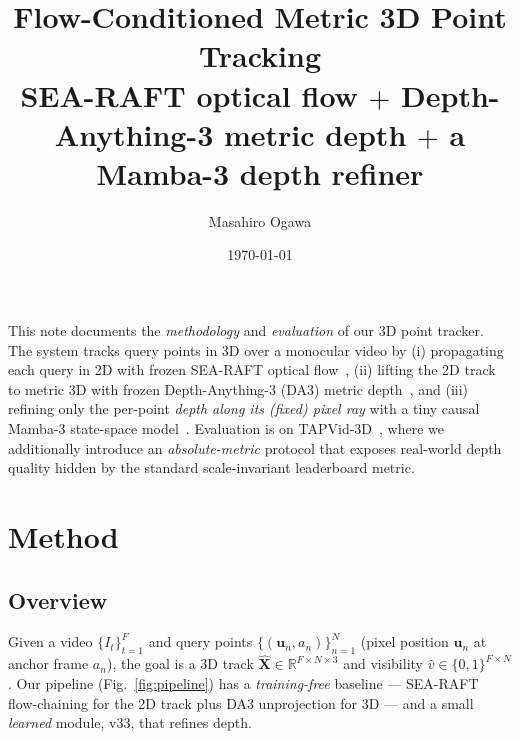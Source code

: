 \documentclass[11pt,a4paper]{article}
\title{\textbf{Flow-Conditioned Metric 3D Point Tracking}\\[2pt]
\large SEA-RAFT optical flow $+$ Depth-Anything-3 metric depth $+$ a Mamba-3 depth refiner}
\author{Masahiro Ogawa}
\date{\today}
\begin{document}
\maketitle

\noindent
This note documents the \emph{methodology} and \emph{evaluation} of our 3D point tracker.
The system tracks query points in 3D over a monocular video by (i) propagating each query in 2D
with frozen SEA-RAFT optical flow~\cite{searaft}, (ii) lifting the 2D track to metric 3D with
frozen Depth-Anything-3 (DA3) metric depth~\cite{da3}, and (iii) refining only the per-point
\emph{depth along its (fixed) pixel ray} with a tiny causal Mamba-3 state-space model~\cite{mamba3}.
Evaluation is on TAPVid-3D~\cite{tapvid3d}, where we additionally introduce an
\emph{absolute-metric} protocol that exposes real-world depth quality hidden by the standard
scale-invariant leaderboard metric.

\tableofcontents

\section{Method}

\subsection{Overview}
Given a video $\{I_t\}_{t=1}^{F}$ and query points $\{(\mathbf{u}_n, a_n)\}_{n=1}^{N}$ (pixel
position $\mathbf{u}_n$ at anchor frame $a_n$), the goal is a 3D track
$\hat{\mathbf X}\in\mathbb{R}^{F\times N\times 3}$ and visibility $\hat v\in\{0,1\}^{F\times N}$.
Our pipeline (Fig.~\ref{fig:pipeline}) has a \emph{training-free} baseline --- SEA-RAFT
flow-chaining for the 2D track plus DA3 unprojection for 3D --- and a small \emph{learned} module,
v33, that refines depth.
\end{document}
